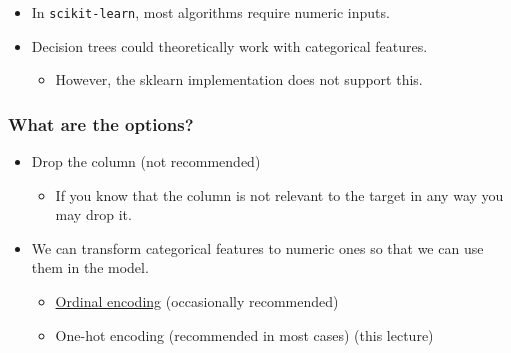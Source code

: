\documentclass[11pt]{article}
\providecommand{\tightlist}{%
      \setlength{\itemsep}{0pt}\setlength{\parskip}{0pt}}
\begin{document}
\begin{itemize}
\tightlist
\item
  In \texttt{scikit-learn}, most algorithms require numeric inputs.
\item
  Decision trees could theoretically work with categorical features.

  \begin{itemize}
  \tightlist
  \item
    However, the sklearn implementation does not support this.
  \end{itemize}
\end{itemize}

    \subsubsection{What are the options?}\label{what-are-the-options}

\begin{itemize}
\tightlist
\item
  Drop the column (not recommended)

  \begin{itemize}
  \tightlist
  \item
    If you know that the column is not relevant to the target in any way
    you may drop it.
  \end{itemize}
\item
  We can transform categorical features to numeric ones so that we can
  use them in the model.

  \begin{itemize}
  \tightlist
  \item
    \href{https://scikit-learn.org/stable/modules/generated/sklearn.preprocessing.OrdinalEncoder.html}{Ordinal
    encoding} (occasionally recommended)
  \item
    One-hot encoding (recommended in most cases) (this lecture)
  \end{itemize}
\end{itemize}
\end{document}
